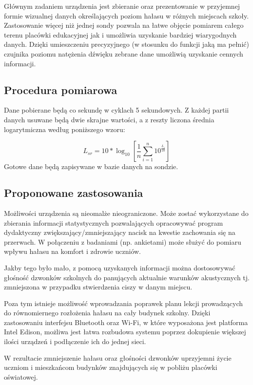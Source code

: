 \documentclass[12pt, a4paper]{article}
\begin{document}
Głównym zadaniem urządzenia jest zbieranie oraz prezentowanie w przyjemnej formie wizualnej danych określających poziom hałasu w różnych miejscach szkoły. Zastosowanie więcej niż jednej sondy pozwala na łatwe objęcie pomiarem całego terenu placówki edukacyjnej jak i umożliwia uzyskanie bardziej wiarygodnych danych. Dzięki umieszczeniu precyzyjnego (w stosunku do funkcji jaką ma pełnić) czujnika poziomu natężenia dźwięku zebrane dane umożliwią uzyskanie cennych informacji.

\subsection{Procedura pomiarowa}

Dane pobierane będą co sekundę w cyklach 5 sekundowych. Z każdej partii danych usuwane będą dwie skrajne wartości, a z reszty liczona średnia logarytmiczna według poniższego wzoru:

\Large
\begin{equation}
L_{sr} = 10*\log_{10}\left[\frac{1}{n}\displaystyle\sum_{i=1}^{n}10^{\frac{L_i}{10}}\right]
\end{equation}
\normalsize
Gotowe dane będą zapisywane w bazie danych na sondzie.

\subsection{Proponowane zastosowania}

Możliwości urządzenia są nieomalże nieograniczone. Może zostać wykorzystane do zbierania informacji statystycznych pozwalających opracowywać program dydaktyczny zwiększający/zmniejszający nacisk na kwestie zachowania się na przerwach. W połączeniu z badaniami (np. ankietami) może służyć do pomiaru wpływu hałasu na komfort i zdrowie uczniów.

Jakby tego było mało, z pomocą uzyskanych informacji można dostosowywać głośność dzwonków szkolnych do panujących aktualnie warunków akustycznych tj. zmniejszona w przypadku stwierdzenia ciszy w danym miejscu.

Poza tym istnieje możliwość wprowadzania poprawek planu lekcji prowadzących do równomiernego rozłożenia hałasu na cały budynek szkolny. Dzięki zastosowaniu interfejsu Bluetooth oraz Wi-Fi, w które wyposażona jest platforma Intel Edison, możliwa jest łatwa rozbudowa systemu poprzez dokupienie większej ilości urządzeń i podłączenie ich do jednej sieci.

W rezultacie zmniejszenie hałasu oraz głośności dzwonków uprzyjemni życie uczniom i mieszkańcom budynków znajdujących się w pobliżu placówki oświatowej.
\end{document}
